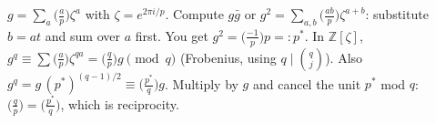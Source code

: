 \documentclass[11pt,a4paper]{article}
\begin{document}
 $g=\sum_a\bigl(\frac ap\bigr)\zeta^a$ with $\zeta=e^{2\pi i/p}$. Compute $g\bar g$ or $g^2=\sum_{a,b}\bigl(\frac{ab}p\bigr)\zeta^{a+b}$: substitute $b=at$ and sum over $a$ first. You get $g^2=\bigl(\frac{-1}p\bigr)p=:p^*$.
 In $\mathbb Z[\zeta]$, $g^q\equiv\sum\bigl(\frac ap\bigr)\zeta^{qa}=\bigl(\frac qp\bigr)g\pmod q$ (Frobenius, using $q\mid\binom qj$).
 Also $g^q=g\,(p^*)^{(q-1)/2}\equiv\bigl(\frac{p^*}q\bigr)g$. Multiply by $g$ and cancel the unit $p^*$ mod $q$: $\bigl(\frac qp\bigr)=\bigl(\frac{p^*}q\bigr)$, which is reciprocity.
\end{document}
